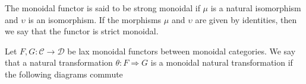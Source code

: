\documentclass[../thesis.tex]{subfiles}
\begin{document}
        The monoidal functor is said to be strong monoidal if $\mu$ is a natural isomorphism and $\upsilon$ is an isomorphism. If the morphisms $\mu$ and $\upsilon$ are given by identities, then we say that the functor is strict monoidal.

        \begin{definition}
            Let $F,G : \mathcal{C} \rightarrow \mathcal{D}$ be lax monoidal functors between monoidal categories. We say that a natural transformation $\theta : F \Rightarrow G$ is a monoidal natural transformation if the following diagrams commute
            \begin{center}
                \quad
            \end{center}
        \end{definition}
\end{document}
